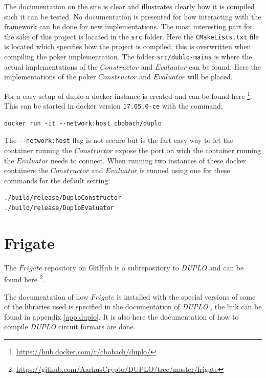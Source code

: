 \documentclass[twoside,11pt,openright]{report}
\newcommand{\DUPLO}{\textit{DUPLO} }
\begin{document}
\begin{appendices}
The documentation on the site is clear and illustrates clearly how it is compiled such it can be tested. No documentation is presented for how interacting with the framework can be done for new implementations. The most interesting part for the sake of this project is located in the \verb|src| folder. Here the \verb|CMakeLists.txt| file is located which specifies how the project is compiled, this is overwritten when compiling the poker implementation. The folder \verb|src/dublo-mains| is where the actual implementations of the $Constructor$ and $Evaluater$ can be found. Here the implementations of the poker $Constructor$ and $Evaluator$ will be placed.

\bigskip

For a easy setup of duplo a docker instance is created and can be found here \footnote{\url{https://hub.docker.com/r/cbobach/duplo/}}. This can be started in docker version \verb|17.05.0-ce| with the command;

\begin{center}
\begin{verbatim}
docker run -it --network:host cbobach/duplo
\end{verbatim}
\end{center}

The \verb|--network:host| flag is not secure but is the fart easy way to let the container running the $Constructor$ expose the port on wich the container running the $Evaluator$ needs to connect. When running two instances of these docker containers the $Constructor$ and $Evaluator$ is runned using one for these commands for the default setting:

\begin{center}
\begin{verbatim}
./build/release/DuploConstructor 
./build/release/DuploEvaluator
\end{verbatim}
\end{center}


\section{Frigate}
\label{app:frigate}
The $Frigate$ repository on GitHub is a subrepository to \DUPLO and can be found here \footnote{\url{https://github.com/AarhusCrypto/DUPLO/tree/master/frigate}}.

The documentation of how $Frigate$ is installed with the special versions of some of the libraries used is specified in the documentation of \DUPLO, the link can be found in appendix \ref{app:duplo}. It is also here the documentation of how to compile \DUPLO circuit formats are done.


\end{appendices}
\end{document}

